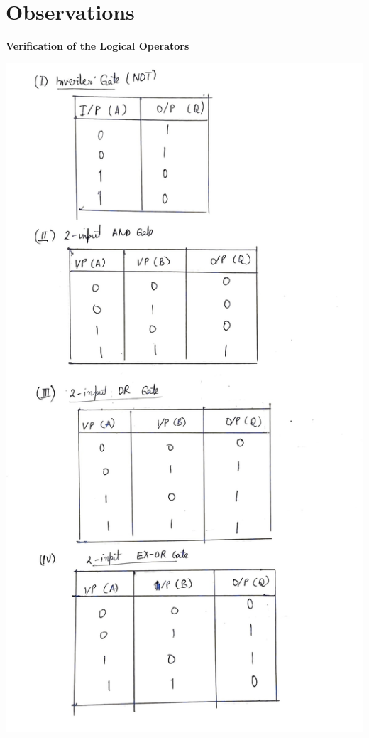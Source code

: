 \section{Observations}
\begin{center}
    \textbf{Verification of the Logical Operators}
\end{center}
\begin{center}
    \includegraphics[scale = 0.25]{Documents/exp4tab1_1.jpg}
\end{center}
